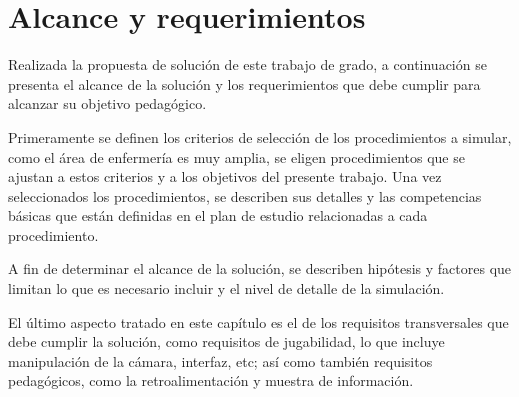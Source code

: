 \chapter{Alcance y requerimientos}
\label{chap:requerimientos}

Realizada la propuesta de solución de este trabajo de grado, a continuación se presenta 
el alcance de la solución y los requerimientos que debe cumplir para alcanzar su
objetivo pedagógico.

Primeramente se definen los criterios de selección de los procedimientos a simular, 
como el área de enfermería es muy amplia, se eligen procedimientos que se ajustan a 
estos criterios y a los objetivos del presente trabajo. Una vez seleccionados los 
procedimientos, se describen sus detalles y las competencias básicas que están definidas 
en el plan de estudio relacionadas a cada procedimiento. 

A fin de determinar el alcance de la solución, se describen hipótesis y factores
que limitan lo que es necesario incluir y el nivel de detalle de la simulación.

El último aspecto tratado en este capítulo es el de los requisitos transversales
que debe cumplir la solución, como requisitos de jugabilidad, lo que incluye manipulación de
la cámara, interfaz, etc; así como también requisitos pedagógicos, como la
retroalimentación y muestra de información.





